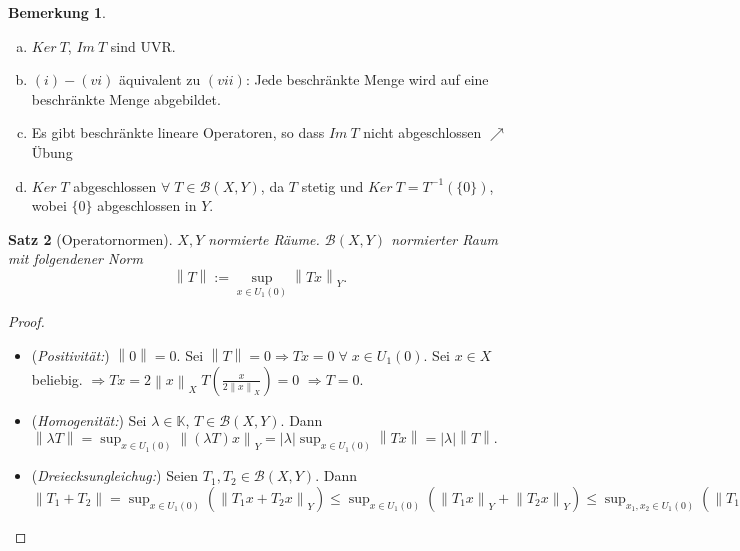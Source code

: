 \documentclass[ngerman]{report}
\theoremstyle{plain}%
\newtheorem{thm}{Satz}[chapter]
\theoremstyle{definition}%
\theoremstyle{myStyle}
\newtheorem{bem}[thm]{Bemerkung}
\newcommand{\K}{\mathbb{K}}
\newcommand{\B}{\mathcal{B}} %
\newcommand{\BS}[1][X,Y]{\mathcal{B}(#1)} %
\newcommand{\norm}[1]{\left \|#1\right\| }
\newcommand{\df}[1][]{%
	\overset{#1}{\Rightarrow}
}
\newcommand{\U}[2][1]{U_{#1}(#2)} %
\newcommand{\EK}{\U{0}} %
\newcommand{\inv}[1]{#1^{-1}}
\newcommand{\disp}{\displaystyle}
\begin{document}
	\begin{bem}
		\begin{enumerate}[a)] \addtocounter{enumi}{3}
			\item $Ker\:T$, $Im\:T$ sind UVR. 
			\item $(i) - (vi)$ äquivalent zu $(vii)$:
				Jede beschränkte Menge wird auf eine beschränkte Menge abgebildet.
			\item Es gibt beschränkte lineare Operatoren, so dass $Im\: T$ nicht abgeschlossen $\nearrow$ Übung
			\item $Ker\; T$ abgeschlossen $\forall \; T\in \B(X,Y)$, da $T$ stetig und $Ker\:T = \inv{T}(\{0\})$, wobei $\{0\}$ abgeschlossen in $Y$.
		\end{enumerate}
	\end{bem}						
	\begin{thm}[Operatornormen]
		$X,Y$ normierte Räume. $\BS$ normierter Raum mit folgendener Norm
		 $$\norm{T} := \disp \sup_{x \in \EK}\norm{Tx}_Y.$$
	\end{thm}
	\begin{proof}
		\begin{itemize}[]
				\item (\textit{Positivität:}) 
					$\norm{0} = 0$. Sei $\norm{T} = 0 \df Tx = 0 \; \forall \; x\in\EK$.
					Sei $x\in X$ beliebig. $\df Tx = 2\norm{x}_X \; T \left(\frac{x}{2\norm{x}_X}\right) = 0$
					$\df T = 0$. 

			\item (\textit{Homogenität:}) Sei $\lambda \in \K$, $T\in \BS$. 
				Dann $\norm{\lambda T} = \sup_{x \in \EK} \norm{ (\lambda T) x}_Y
				= |\lambda| \sup_{x \in \EK} \norm{Tx} = |\lambda| \norm{ T}.$
			
			\item (\textit{Dreiecksungleichug:}) Seien $T_1, T_2 \in\BS$. Dann 
				$\disp \norm{T_1 + T_2} = \sup_{x \in \EK}(\norm{T_1x + T_2x}_Y)
				\leq \sup_{x \in \EK}(\norm{T_1x}_Y + \norm{T_2x}_Y)
				\leq \sup_{x_1,x_2  \in \EK}(\norm{T_1x_1}_Y + \norm{T_2x_2}_Y)
				\leq \sup_{x_1 \in \EK}\norm{T_1x_1}_Y + \sup_{x_2 \in \EK}\norm{T_1x_2}_Y
				= \norm{T_1} + \norm{T_2}$
		\end{itemize}
	\end{proof}
		
\end{document}

